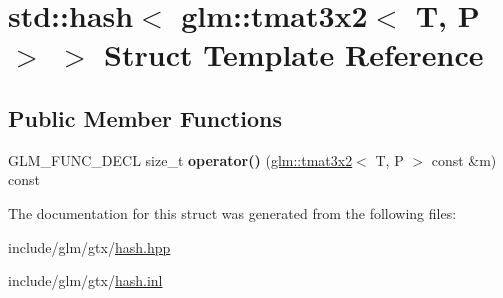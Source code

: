 \hypertarget{structstd_1_1hash_3_01glm_1_1tmat3x2_3_01T_00_01P_01_4_01_4}{}\section{std\+:\+:hash$<$ glm\+:\+:tmat3x2$<$ T, P $>$ $>$ Struct Template Reference}
\label{structstd_1_1hash_3_01glm_1_1tmat3x2_3_01T_00_01P_01_4_01_4}
\subsection*{Public Member Functions}
\begin{DoxyCompactItemize}
\item 
\mbox{\label{structstd_1_1hash_3_01glm_1_1tmat3x2_3_01T_00_01P_01_4_01_4_a939aa5ed3298c57a32d1d52c796505a9}} 
G\+L\+M\+\_\+\+F\+U\+N\+C\+\_\+\+D\+E\+CL size\+\_\+t {\bfseries operator()} (\hyperlink{structglm_1_1tmat3x2}{glm\+::tmat3x2}$<$ T, P $>$ const \&m) const
\end{DoxyCompactItemize}


The documentation for this struct was generated from the following files\+:\begin{DoxyCompactItemize}
\item 
include/glm/gtx/\hyperlink{hash_8hpp}{hash.\+hpp}\item 
include/glm/gtx/\hyperlink{hash_8inl}{hash.\+inl}\end{DoxyCompactItemize}
